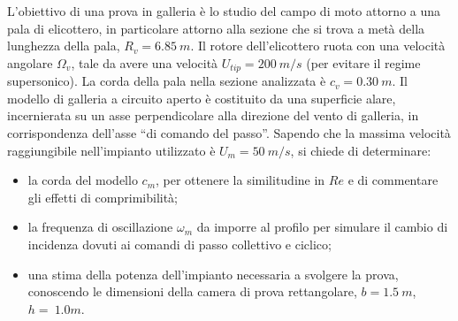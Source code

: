 \begin{minipage}[l]{0.5\textwidth}
 \begin{exerciseS}
 L'obiettivo di una prova in galleria è lo studio del campo di moto
  attorno a una pala di elicottero, in particolare attorno alla sezione
  che si trova a metà della lunghezza della pala, $R_v = 6.85\ m$. Il rotore
  dell'elicottero ruota con una velocità angolare $\Omega_v$, tale da
  avere una velocità $U_{tip} = 200 \ m/s$ (per evitare il regime
  supersonico). La corda della pala nella sezione analizzata è
  $c_v = 0.30 \ m$.
 Il modello di galleria a circuito aperto è costituito da una superficie
  alare, incernierata su un asse perpendicolare alla direzione del vento
  di galleria, in corrispondenza dell'asse ``di comando del passo''.
 Sapendo che la massima velocità raggiungibile nell'impianto utilizzato
  è $U_m = 50 \ m/s$, si chiede di determinare:
\begin{itemize}
  \item la corda del modello $c_m$, per ottenere la similitudine in $Re$ e di
    commentare gli effetti di comprimibilità;
  \item la frequenza di oscillazione $\omega_m$ da imporre al profilo per
    simulare il cambio di incidenza dovuti ai comandi di passo collettivo
    e ciclico;
  \item una stima della potenza dell'impianto necessaria a svolgere la prova,
    conoscendo le dimensioni della camera di prova rettangolare, $b = 1.5 \ m$,
    $h = \ 1.0 m$.
\end{itemize}  
 \end{exerciseS}
\hfill
\end{minipage}
\hspace{3mm}
